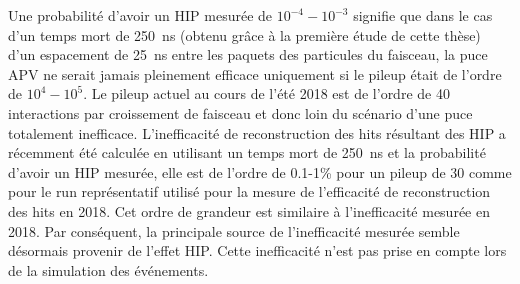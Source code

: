 

Une probabilité d'avoir un HIP mesurée de $10^{-4}-10^{-3}$ signifie que dans le cas d'un temps mort de 250~ns (obtenu grâce à la première étude de cette thèse) d'un espacement de 25~ns entre les paquets des particules du faisceau, la puce APV ne serait jamais pleinement efficace uniquement si le pileup était de l'ordre de $10^4 - 10^5$. Le pileup actuel au cours de l'été 2018 est de l'ordre de 40 interactions par croissement de faisceau et donc loin du scénario d'une puce totalement inefficace. L'inefficacité de reconstruction des hits résultant des HIP a récemment été calculée en utilisant un temps mort de 250~ns et la probabilité d'avoir un HIP mesurée, elle est de l'ordre de 0.1-1\% pour un pileup de 30 comme pour le run représentatif utilisé pour la mesure de l'efficacité de reconstruction des hits en 2018. Cet ordre de grandeur est similaire à l'inefficacité mesurée en 2018. Par conséquent, la principale source de l’inefficacité mesurée semble désormais provenir de l’effet HIP. Cette inefficacité n'est pas prise en compte lors de la simulation des événements.


